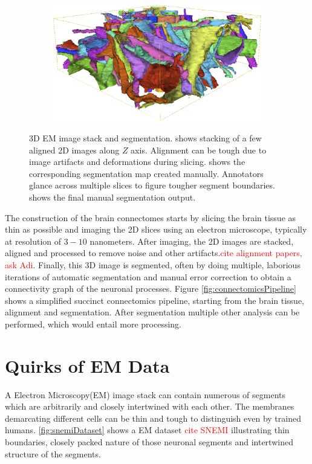 \begin{figure}[htpb]
\begin{subfigure}[b]{\mywidth}
		\caption{\label{fig:seg_stack}}
	\end{subfigure}
	\hspace{3mm}
	\begin{subfigure}[b]{\mywidthlarge}
		\centering
		\includegraphics[width=\textwidth]{data/images/stack/seg_3d.png}
		\caption{\label{fig:seg_3d}}
	\end{subfigure}
	\caption{3D EM image stack and segmentation.  shows stacking of a few aligned 2D images along $Z$ axis. Alignment can be tough due to image artifacts and deformations during slicing.  shows the corresponding segmentation map created manually. Annotators glance across multiple slices to figure tougher segment boundaries.  shows the final manual segmentation output.}
	\label{fig:emSegmenting}
\end{figure}

The construction of the brain connectomes starts by slicing the brain tissue as thin as possible and imaging the 2D slices using an electron microscope, typically at resolution of $3 - 10$ nanometers. After imaging, the 2D images are stacked, aligned and processed to remove noise and other artifacts.\textcolor{red}{cite alignment papers, ask Adi}. Finally, this 3D image is segmented, often by doing multiple, laborious iterations of automatic segmentation and manual error correction to obtain a connectivity graph of the neuronal processes. Figure \ref{fig:connectomicsPipeline} shows a simplified succinct connectomics pipeline, starting from the brain tissue, alignment and segmentation. After segmentation multiple other analysis can be performed, which would entail more processing.


\section{Quirks of EM Data}
A Electron Microscopy(EM) image stack can contain numerous of segments which are arbitrarily and closely intertwined with each other. The membranes demarcating different cells can be thin and tough to distinguish even by trained humans. \autoref{fig:snemiDataset} shows a EM dataset \textcolor{red}{cite SNEMI} illustrating thin boundaries, closely packed nature of those neuronal segments and intertwined structure of the segments.

